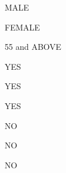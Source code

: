\documentclass[a4paper,portrait,12pt]{article}
\begin{document}
\begin{flushleft}
MALE
\end{flushleft}





\begin{flushleft}
FEMALE
\end{flushleft}





\begin{flushleft}
55 and ABOVE
\end{flushleft}





\begin{flushleft}
YES
\end{flushleft}





\begin{flushleft}
YES
\end{flushleft}





\begin{flushleft}
YES
\end{flushleft}





\begin{flushleft}
NO
\end{flushleft}





\begin{flushleft}
NO
\end{flushleft}





\begin{flushleft}
NO
\end{flushleft}





\newpage
\end{document}
